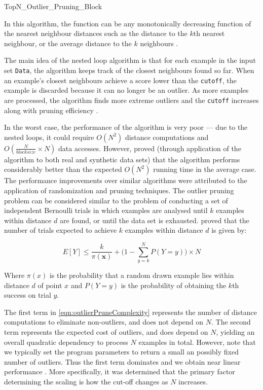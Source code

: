 \begin{algorithm}
    
    \caption{TopN\_Outlier\_Pruning\_Block}
    \label{algm:TopNOutlierPruningBlock}
\end{algorithm}

In this algorithm, the  function can be any monotonically
decreasing function of the nearest neighbour distances such as the distance to
the $k$th nearest neighbour, or the average distance to the $k$ neighbours
\cite{Bay:2003}.

The main idea of the nested loop algorithm is that for each example in the
input set \verb+Data+, the algorithm keeps track of the closest neighbours found
so far. When an example's closest neighbours achieve a score lower than the
\verb+cutoff+, the example is discarded because it can no longer be an outlier.
As more examples are processed, the algorithm finds more extreme outliers and
the \verb+cutoff+ increases along with pruning efficiency \cite{Bay:2003}.

In the worst case, the performance of the algorithm is very poor --- due to the
nested loops, it could require $O(N^{2})$ distance computations and
$O(\frac{N}{blocksize} \times N)$ data accesses. However, \citeauthor{Bay:2003}
proved (through application of the algorithm to both real and synthetic data
sets) that the algorithm performs considerably better than the expected
$O(N^{2})$ running time in the average case. The performance improvements over
similar algorithms were attributed to the application of randomization and
pruning techniques. The outlier pruning problem can be considered similar to the
problem of conducting a set of independent Bernoulli trials in which examples
are analysed until $k$ examples within distance $d$ are found, or until the data
set is exhausted. \citeauthor{Bay:2003} proved that the number of trials
expected to achieve $k$ examples within distance $d$ is given by:

\begin{equation}
    E[Y] \leq \frac{k}{\pi(\textbf{x})} + \Bigg(1-\sum_{y=k}^{N} P(Y=y)\Bigg) \times N
    \label{eqn:outlierPruneComplexity}
\end{equation}

Where $\pi(x)$ is the probability that a random drawn example lies within
distance $d$ of point $x$ and $P(Y=y)$ is the probability of obtaining the $k$th
success on trial $y$.

The first term in \autoref{eqn:outlierPruneComplexity} represents the number of
distance computations to eliminate non-outliers, and does not depend on $N$. The
second term represents the expected cost of outliers, and does depend on $N$,
yielding an overall quadratic dependency to process $N$ examples in total.
However, note that we typically set the program parameters to return a small an
possibly fixed number of outliers. Thus the first term dominates and we obtain
near linear performance \cite{Bay:2003}. More specifically, it was determined
that the primary factor determining the scaling is how the cut-off changes as
$N$ increases.

